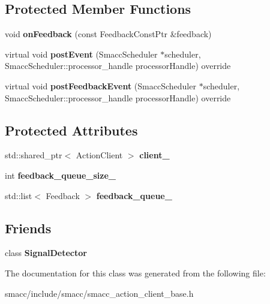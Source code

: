 \subsection*{Protected Member Functions}
\begin{DoxyCompactItemize}
\item 
\mbox{\label{classsmacc_1_1SmaccActionClientBase_a9ba39f09edcf9a4737d8cb0f0d6ee5e2}} 
void {\bfseries on\+Feedback} (const Feedback\+Const\+Ptr \&feedback)
\item 
\mbox{\label{classsmacc_1_1SmaccActionClientBase_a2e2d131731d54ea529f6ff2ebb0c63cd}} 
virtual void {\bfseries post\+Event} (Smacc\+Scheduler $\ast$scheduler, Smacc\+Scheduler\+::processor\+\_\+handle processor\+Handle) override
\item 
\mbox{\label{classsmacc_1_1SmaccActionClientBase_a8e500f37853599d32c39483d442ede72}} 
virtual void {\bfseries post\+Feedback\+Event} (Smacc\+Scheduler $\ast$scheduler, Smacc\+Scheduler\+::processor\+\_\+handle processor\+Handle) override
\end{DoxyCompactItemize}
\subsection*{Protected Attributes}
\begin{DoxyCompactItemize}
\item 
\mbox{\label{classsmacc_1_1SmaccActionClientBase_a10d3b707b855c6d360aeeb35e50cd0c7}} 
std\+::shared\+\_\+ptr$<$ Action\+Client $>$ {\bfseries client\+\_\+}
\item 
\mbox{\label{classsmacc_1_1SmaccActionClientBase_a834575fe2be93d0ccada8c1d486c49cd}} 
int {\bfseries feedback\+\_\+queue\+\_\+size\+\_\+}
\item 
\mbox{\label{classsmacc_1_1SmaccActionClientBase_a66fe8948b906b832b06b5dae469d8dc4}} 
std\+::list$<$ Feedback $>$ {\bfseries feedback\+\_\+queue\+\_\+}
\end{DoxyCompactItemize}
\subsection*{Friends}
\begin{DoxyCompactItemize}
\item 
\mbox{\label{classsmacc_1_1SmaccActionClientBase_a9fb9044f83e768849d1b42d9d0d5508e}} 
class {\bfseries Signal\+Detector}
\end{DoxyCompactItemize}


The documentation for this class was generated from the following file\+:\begin{DoxyCompactItemize}
\item 
smacc/include/smacc/smacc\+\_\+action\+\_\+client\+\_\+base.\+h\end{DoxyCompactItemize}
